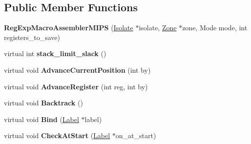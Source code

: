 \subsection*{Public Member Functions}
\begin{DoxyCompactItemize}
\item 
{\bfseries Reg\+Exp\+Macro\+Assembler\+M\+I\+PS} (\hyperlink{classv8_1_1internal_1_1_isolate}{Isolate} $\ast$isolate, \hyperlink{classv8_1_1internal_1_1_zone}{Zone} $\ast$zone, Mode mode, int registers\+\_\+to\+\_\+save)\hypertarget{classv8_1_1internal_1_1_reg_exp_macro_assembler_m_i_p_s_aa6806a1e3af86ec20cc1077c01607b24}{}\label{classv8_1_1internal_1_1_reg_exp_macro_assembler_m_i_p_s_aa6806a1e3af86ec20cc1077c01607b24}

\item 
virtual int {\bfseries stack\+\_\+limit\+\_\+slack} ()\hypertarget{classv8_1_1internal_1_1_reg_exp_macro_assembler_m_i_p_s_ade29d0ccd6722e1078ec888188917f9d}{}\label{classv8_1_1internal_1_1_reg_exp_macro_assembler_m_i_p_s_ade29d0ccd6722e1078ec888188917f9d}

\item 
virtual void {\bfseries Advance\+Current\+Position} (int by)\hypertarget{classv8_1_1internal_1_1_reg_exp_macro_assembler_m_i_p_s_a8b46dd14d6be7b20399d60416582b610}{}\label{classv8_1_1internal_1_1_reg_exp_macro_assembler_m_i_p_s_a8b46dd14d6be7b20399d60416582b610}

\item 
virtual void {\bfseries Advance\+Register} (int reg, int by)\hypertarget{classv8_1_1internal_1_1_reg_exp_macro_assembler_m_i_p_s_a9ab2276500b78ea3c12268dd9bb4ba7c}{}\label{classv8_1_1internal_1_1_reg_exp_macro_assembler_m_i_p_s_a9ab2276500b78ea3c12268dd9bb4ba7c}

\item 
virtual void {\bfseries Backtrack} ()\hypertarget{classv8_1_1internal_1_1_reg_exp_macro_assembler_m_i_p_s_adfe2e4c2ea84a1ab5ad151218f899ded}{}\label{classv8_1_1internal_1_1_reg_exp_macro_assembler_m_i_p_s_adfe2e4c2ea84a1ab5ad151218f899ded}

\item 
virtual void {\bfseries Bind} (\hyperlink{classv8_1_1internal_1_1_label}{Label} $\ast$label)\hypertarget{classv8_1_1internal_1_1_reg_exp_macro_assembler_m_i_p_s_ac4858be1e00e71c992e568de14abe61a}{}\label{classv8_1_1internal_1_1_reg_exp_macro_assembler_m_i_p_s_ac4858be1e00e71c992e568de14abe61a}

\item 
virtual void {\bfseries Check\+At\+Start} (\hyperlink{classv8_1_1internal_1_1_label}{Label} $\ast$on\+\_\+at\+\_\+start)\hypertarget{classv8_1_1internal_1_1_reg_exp_macro_assembler_m_i_p_s_a0f87ac84fa8e60eeafa27e85b258b6ab}{}\label{classv8_1_1internal_1_1_reg_exp_macro_assembler_m_i_p_s_a0f87ac84fa8e60eeafa27e85b258b6ab}


\end{DoxyCompactItemize}
